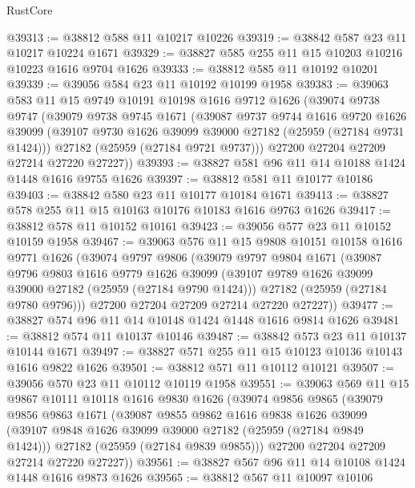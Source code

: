 \begin{lexlean}{RustCore}
\begin{coremodule}
@39313 := @38812 @588 @11 @10217 @10226
@39319 := @38842 @587 @23 @11 @10217 @10224 @1671
@39329 := @38827 @585 @255 @11 @15 @10203 @10216 @10223 @1616 @9704 @1626
@39333 := @38812 @585 @11 @10192 @10201
@39339 := @39056 @584 @23 @11 @10192 @10199 @1958
@39383 := @39063
    @583
    @11
    @15
    @9749
    @10191
    @10198
    @1616
    @9712
    @1626
    (@39074
      @9738
      @9747
      (@39079
        @9738
        @9745
        @1671
        (@39087
          @9737
          @9744
          @1616
          @9720
          @1626
          @39099
          (@39107 @9730 @1626 @39099 @39000 @27182 (@25959 (@27184 @9731 @1424)))
          @27182
          (@25959 (@27184 @9721 @9737)))
        @27200
        @27204
        @27209
        @27214
        @27220
        @27227))
@39393 := @38827 @581 @96 @11 @14 @10188 @1424 @1448 @1616 @9755 @1626
@39397 := @38812 @581 @11 @10177 @10186
@39403 := @38842 @580 @23 @11 @10177 @10184 @1671
@39413 := @38827 @578 @255 @11 @15 @10163 @10176 @10183 @1616 @9763 @1626
@39417 := @38812 @578 @11 @10152 @10161
@39423 := @39056 @577 @23 @11 @10152 @10159 @1958
@39467 := @39063
    @576
    @11
    @15
    @9808
    @10151
    @10158
    @1616
    @9771
    @1626
    (@39074
      @9797
      @9806
      (@39079
        @9797
        @9804
        @1671
        (@39087
          @9796
          @9803
          @1616
          @9779
          @1626
          @39099
          (@39107 @9789 @1626 @39099 @39000 @27182 (@25959 (@27184 @9790 @1424)))
          @27182
          (@25959 (@27184 @9780 @9796)))
        @27200
        @27204
        @27209
        @27214
        @27220
        @27227))
@39477 := @38827 @574 @96 @11 @14 @10148 @1424 @1448 @1616 @9814 @1626
@39481 := @38812 @574 @11 @10137 @10146
@39487 := @38842 @573 @23 @11 @10137 @10144 @1671
@39497 := @38827 @571 @255 @11 @15 @10123 @10136 @10143 @1616 @9822 @1626
@39501 := @38812 @571 @11 @10112 @10121
@39507 := @39056 @570 @23 @11 @10112 @10119 @1958
@39551 := @39063
    @569
    @11
    @15
    @9867
    @10111
    @10118
    @1616
    @9830
    @1626
    (@39074
      @9856
      @9865
      (@39079
        @9856
        @9863
        @1671
        (@39087
          @9855
          @9862
          @1616
          @9838
          @1626
          @39099
          (@39107 @9848 @1626 @39099 @39000 @27182 (@25959 (@27184 @9849 @1424)))
          @27182
          (@25959 (@27184 @9839 @9855)))
        @27200
        @27204
        @27209
        @27214
        @27220
        @27227))
@39561 := @38827 @567 @96 @11 @14 @10108 @1424 @1448 @1616 @9873 @1626
@39565 := @38812 @567 @11 @10097 @10106

\end{coremodule}
\end{lexlean}
